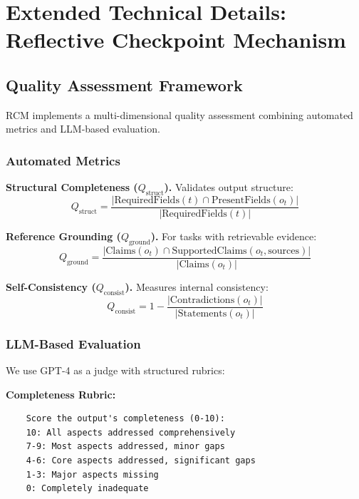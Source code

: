 \documentclass{article}
\theoremstyle{plain}
\theoremstyle{definition}
\theoremstyle{remark}
\begin{document}

\section{Extended Technical Details: Reflective Checkpoint Mechanism}
\label{sec:rcm_extended}

\subsection{Quality Assessment Framework}
\label{sec:rcm_quality}

RCM implements a multi-dimensional quality assessment combining automated metrics and LLM-based evaluation.

\subsubsection{Automated Metrics}

\textbf{Structural Completeness ($Q_{\text{struct}}$).} Validates output structure:
\begin{equation}
	Q_{\text{struct}} = \frac{|\text{RequiredFields}(t) \cap \text{PresentFields}(o_t)|}{|\text{RequiredFields}(t)|}
\end{equation}

\textbf{Reference Grounding ($Q_{\text{ground}}$).} For tasks with retrievable evidence:
\begin{equation}
	Q_{\text{ground}} = \frac{|\text{Claims}(o_t) \cap \text{SupportedClaims}(o_t, \text{sources})|}{|\text{Claims}(o_t)|}
\end{equation}

\textbf{Self-Consistency ($Q_{\text{consist}}$).} Measures internal consistency:
\begin{equation}
	Q_{\text{consist}} = 1 - \frac{|\text{Contradictions}(o_t)|}{|\text{Statements}(o_t)|}
\end{equation}

\subsubsection{LLM-Based Evaluation}

We use GPT-4 as a judge with structured rubrics:

\textbf{Completeness Rubric:}
\begin{verbatim}
	Score the output's completeness (0-10):
	10: All aspects addressed comprehensively
	7-9: Most aspects addressed, minor gaps
	4-6: Core aspects addressed, significant gaps
	1-3: Major aspects missing
	0: Completely inadequate
\end{verbatim}
\end{document}
